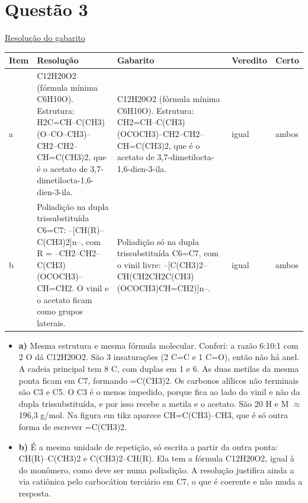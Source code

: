 \documentclass{article}%
\begin{document}
\section*{Questão 3}%
\href{https://poliedroresolve.sistemapoliedro.com.br/vestibulares/ime/2026/ime-2-fase-dia-3-25-10-2025-2-fase-dia-3/dissertativa-3-quimica-2-fase-dia-3-ime-2026}{Resolução do gabarito}\par\smallskip%
\begin{longtable}{@{}p{} p{} p{} p{} p{}@{}}\toprule Item & Resolução & Gabarito & Veredito & Certo \\ \midrule
a & C12H20O2 (fórmula mínima C6H10O). Estrutura: H2C=CH--C(CH3)(O--CO--CH3)--CH2--CH2--CH=C(CH3)2, que é o acetato de 3,7{-}dimetilocta{-}1,6{-}dien{-}3{-}ila. & C12H20O2 (fórmula mínima C6H10O). Estrutura: CH2=CH--C(CH3)(OCOCH3)--CH2--CH2--CH=C(CH3)2, que é o acetato de 3,7{-}dimetilocta{-}1,6{-}dien{-}3{-}ila. & igual & ambos \\
b & Poliadição na dupla trissubstituída C6=C7: --{[}CH(R)--C(CH3)2{]}n--, com R = --CH2--CH2--C(CH3)(OCOCH3)--CH=CH2. O vinil e o acetato ficam como grupos laterais. & Poliadição só na dupla trissubstituída C6=C7, com o vinil livre: --{[}C(CH3)2--CH(CH2CH2C(CH3)(OCOCH3)CH=CH2){]}n--. & igual & ambos \\
\bottomrule\end{longtable}%
\begin{itemize}%
\item%
\textbf{a)} Mesma estrutura e mesma fórmula molecular. Conferi: a razão 6:10:1 com 2 O dá C12H20O2. São 3 insaturações (2 C=C e 1 C=O), então não há anel. A cadeia principal tem 8 C, com duplas em 1 e 6. As duas metilas da mesma ponta ficam em C7, formando =C(CH3)2. Os carbonos alílicos não terminais são C3 e C5. O C3 é o menos impedido, porque fica ao lado do vinil e não da dupla trissubstituída, e por isso recebe a metila e o acetato. São 20 H e M $\approx$ 196,3 g/mol. Na figura em tikz aparece CH=C(CH3)--CH3, que é só outra forma de escrever =C(CH3)2.%
\item%
\textbf{b)} É a mesma unidade de repetição, só escrita a partir da outra ponta: CH(R)--C(CH3)2 e C(CH3)2--CH(R). Ela tem a fórmula C12H20O2, igual à do monômero, como deve ser numa poliadição. A resolução justifica ainda a via catiônica pelo carbocátion terciário em C7, o que é coerente e não muda a resposta.%
\end{itemize}%
\end{document}
